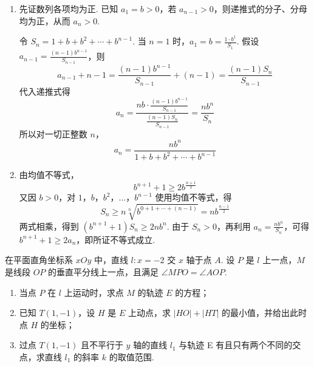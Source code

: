 \begin{solution}
\begin{enumerate}
\item 先证数列各项均为正. 已知 \(a_1=b>0\)，若 \(a_{n-1}>0\)，则递推式的分子、分母均为正，从而 \(a_n>0\).

令 \(S_n=1+b+b^2+\cdots+b^{n-1}\). 当 \(n=1\) 时，\(a_1=b=\frac{1\cdot b^1}{S_1}\). 假设 \(a_{n-1}=\frac{(n-1)b^{n-1}}{S_{n-1}}\)，则
\[
a_{n-1}+n-1=\frac{(n-1)b^{n-1}}{S_{n-1}}+(n-1)=\frac{(n-1)S_n}{S_{n-1}}
\]
代入递推式得
\[
a_n=\frac{nb\cdot\frac{(n-1)b^{n-1}}{S_{n-1}}}{\frac{(n-1)S_n}{S_{n-1}}}=\frac{nb^n}{S_n}
\]
所以对一切正整数 \(n\)，
\[
a_n=\frac{nb^n}{1+b+b^2+\cdots+b^{n-1}}
\]
\item 由均值不等式，
\[
b^{n+1}+1\geqslant2b^{\frac{n+1}{2}}
\]
又因 \(b>0\)，对 \(1\)，\(b\)，\(b^2\)，\(\ldots\)，\(b^{n-1}\) 使用均值不等式，得
\[
S_n\geqslant n\sqrt[n]{b^{0+1+\cdots+(n-1)}}=nb^{\frac{n-1}{2}}
\]
两式相乘，得到 \((b^{n+1}+1)S_n\geqslant2nb^n\). 由于 \(S_n>0\)，再利用 \(a_n=\frac{nb^n}{S_n}\)，可得 \(b^{n+1}+1\geqslant2a_n\)，即所证不等式成立.
\end{enumerate}
\end{solution}

\begin{problem}
在平面直角坐标系 \(xOy\) 中，直线 \(l: x = -2\) 交 \(x\) 轴于点 \(A\). 设 \(P\) 是 \(l\) 上一点，\(M\) 是线段 \(OP\) 的垂直平分线上一点，且满足 \(\angle MPO = \angle AOP\).
\begin{enumerate}
\item 当点 \(P\) 在 \(l\) 上运动时，求点 \(M\) 的轨迹 \(E\) 的方程；
\item 已知 \(T(1,-1)\)，设 \(H\) 是 \(E\) 上动点，求 \( |HO| + |HT| \) 的最小值，并给出此时点 \(H\) 的坐标；
\item 过点 \(T(1, -1)\) 且不平行于 \(y\) 轴的直线 \(l_{1}\) 与轨迹 E 有且只有两个不同的交点，求直线 \(l_{1}\) 的斜率 \(k\) 的取值范围.
\end{enumerate}
\end{problem}

